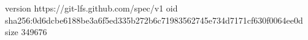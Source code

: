 version https://git-lfs.github.com/spec/v1
oid sha256:0d6dcbe6188be3a6f5ed335b272b6c71983562745e734d7171cf630f0064ee0d
size 349676
